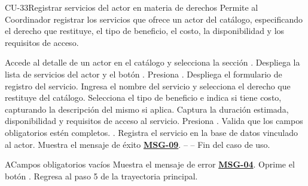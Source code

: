 \begin{UseCase}{CU-33}{Registrar servicios del actor en materia de derechos}{
	Permite al Coordinador registrar los servicios que ofrece un actor del catálogo, especificando el derecho que restituye, el tipo de beneficio, el costo, la disponibilidad y los requisitos de acceso.
}
\end{UseCase}

\begin{UCtrayectoria}
	\UCpaso[\UCactor] Accede al detalle de un actor en el catálogo y selecciona la sección .
	\UCpaso Despliega la lista de servicios del actor y el botón .
	\UCpaso[\UCactor] Presiona .
	\UCpaso Despliega el formulario de registro del servicio.
	\UCpaso[\UCactor] Ingresa el nombre del servicio y selecciona el derecho que restituye del catálogo.
	\UCpaso[\UCactor] Selecciona el tipo de beneficio e indica si tiene costo, capturando la descripción del mismo si aplica.
	\UCpaso[\UCactor] Captura la duración estimada, disponibilidad y requisitos de acceso al servicio.
	\UCpaso[\UCactor] Presiona .
	\UCpaso Valida que los campos obligatorios estén completos. .
	\UCpaso Registra el servicio en la base de datos vinculado al actor.
	\UCpaso Muestra el mensaje de éxito \hyperlink{mMSG09}{\bf MSG-09}.
	\UCpaso[] -- -- Fin del caso de uso.
\end{UCtrayectoria}

\begin{UCtrayectoriaA}{A}{Campos obligatorios vacíos}
	\UCpaso Muestra el mensaje de error \hyperlink{mMSG04}{\bf MSG-04}.
	\UCpaso[\UCactor] Oprime el botón .
	\UCpaso Regresa al paso 5 de la trayectoria principal.
\end{UCtrayectoriaA}

